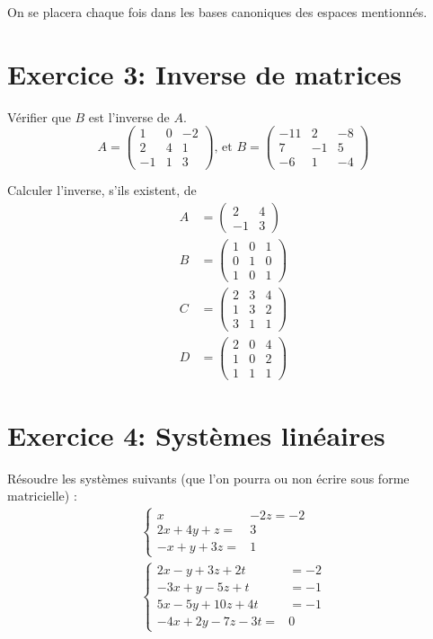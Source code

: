 On se placera chaque fois dans les bases canoniques des espaces mentionnés.

\section*{Exercice 3: Inverse de matrices}

Vérifier que \(B\) est l'inverse de \(A\).
\[
A=\left(\begin{array}{ccc}
1 & 0 & -2 \\
2 & 4 & 1 \\
-1 & 1 & 3
\end{array}\right) \text {, et } B=\left(\begin{array}{ccc}
-11 & 2 & -8 \\
7 & -1 & 5 \\
-6 & 1 & -4
\end{array}\right)
\]

Calculer l'inverse, s'ils existent, de
\[
\begin{aligned}
A & =\left(\begin{array}{cc}
2 & 4 \\
-1 & 3
\end{array}\right) \\
B & =\left(\begin{array}{lll}
1 & 0 & 1 \\
0 & 1 & 0 \\
1 & 0 & 1
\end{array}\right) \\
C & =\left(\begin{array}{lll}
2 & 3 & 4 \\
1 & 3 & 2 \\
3 & 1 & 1
\end{array}\right) \\
D & =\left(\begin{array}{lll}
2 & 0 & 4 \\
1 & 0 & 2 \\
1 & 1 & 1
\end{array}\right)
\end{aligned}
\]

\section*{Exercice 4: Systèmes linéaires}

Résoudre les systèmes suivants (que l'on pourra ou non écrire sous forme matricielle) :
\[
\begin{gathered}
\left\{\begin{array}{cr}
x & -2 z=-2 \\
2 x+4 y+z= & 3 \\
-x+y+3 z= & 1
\end{array}\right. \\
\left\{\begin{array}{ccc}
2 x-y+3 z+2 t & =-2 \\
-3 x+y-5 z+t & =-1 \\
5 x-5 y+10 z+4 t & =-1 \\
-4 x+2 y-7 z-3 t= & 0
\end{array}\right.
\end{gathered}
\]

